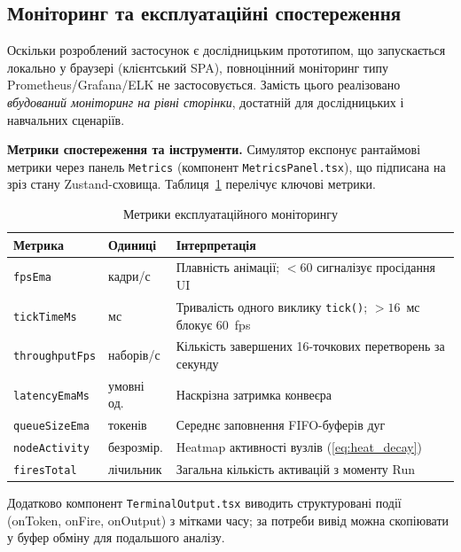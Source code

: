 \subsection{Моніторинг та експлуатаційні спостереження}

Оскільки розроблений застосунок є дослідницьким прототипом, що
запускається локально у браузері (клієнтський SPA), повноцінний
моніторинг типу Prometheus/Grafana/ELK не застосовується. Замість
цього реалізовано \emph{вбудований моніторинг на рівні сторінки},
достатній для дослідницьких і навчальних сценаріїв.

\textbf{Метрики спостереження та інструменти.} Симулятор експонує
рантаймові метрики через панель \texttt{Metrics} (компонент
\texttt{MetricsPanel.tsx}), що підписана на зріз стану Zustand-сховища.
Таблиця~\ref{tab:monitoring_metrics} перелічує ключові метрики.

\begin{table}[H]
  \caption{Метрики експлуатаційного моніторингу}
  \label{tab:monitoring_metrics}
  \centering
  \begin{tabular}{p{3.8cm}p{4.0cm}p{6.5cm}}
    \toprule
    Метрика & Одиниці & Інтерпретація \\
    \midrule
    \texttt{fpsEma}           & кадри/с    & Плавність анімації; $<60$ сигналізує просідання UI \\
    \texttt{tickTimeMs}       & мс         & Тривалість одного виклику \texttt{tick()}; $>16$~мс блокує 60~fps \\
    \texttt{throughputFps}    & наборів/с  & Кількість завершених 16-точкових перетворень за секунду \\
    \texttt{latencyEmaMs}     & умовні од. & Наскрізна затримка конвеєра \\
    \texttt{queueSizeEma}     & токенів    & Середнє заповнення FIFO-буферів дуг \\
    \texttt{nodeActivity}     & безрозмір. & Heatmap активності вузлів (\ref{eq:heat_decay}) \\
    \texttt{firesTotal}       & лічильник  & Загальна кількість активацій з моменту Run \\
    \bottomrule
  \end{tabular}
\end{table}

Додатково компонент \texttt{TerminalOutput.tsx} виводить структуровані
події (onToken, onFire, onOutput) з мітками часу; за потреби вивід
можна скопіювати у буфер обміну для подальшого аналізу.

